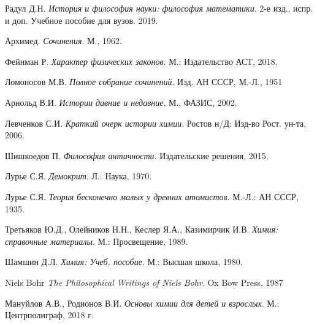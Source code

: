 \begin{thebibliography}{9}

Радул Д.Н. 
\textit{История и философия науки: философия математики}. 2-е изд., испр. и доп. Учебное пособие для вузов. 2019.

Архимед.
\textit{Сочинения}. М., 1962.

Фейнман Р.
\textit{Характер физических законов}. М.: Издательство АСТ, 2018.

Ломоносов М.В.
\textit{Полное собрание сочинений}. Изд. АН СССР, М.-Л., 1951

Арнольд В.И.
\textit{Истории давние и недавние}. М., ФАЗИС, 2002.

Левченков С.И.
\textit{Краткий очерк истории химии}. Ростов н/Д: Изд-во Рост. ун-та, 2006.

Шишкоедов П.
\textit{Философия античности}. Издательские решения, 2015.

Лурье С.Я.
\textit{Демокрит}. Л.: Наука, 1970.

Лурье С.Я.
\textit{Теория бесконечно малых у древних атомистов}.  М.-Л.: АН СССР, 1935.

Третьяков Ю.Д., Олейников Н.Н., Кеслер Я.А., Казимирчик И.В.
\textit{Химия: справочные материалы}. М.: Просвещение, 1989.

Шамшин Д.Л.
\textit{Химия: Учеб. пособие}. М.: Высшая школа, 1980.

Niels Bohr
\textit{The Philosophical Writings of Niels Bohr}. Ox Bow Press, 1987

Мануйлов А.В., Родионов В.И.
\textit{Основы химии для детей и взрослых}. М.: Центрполиграф, 2018 г.

\end{thebibliography}
